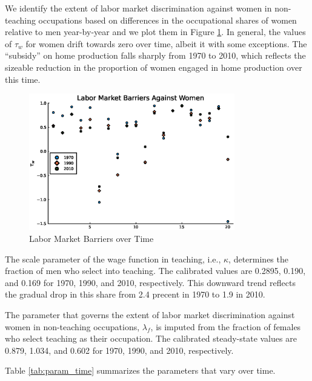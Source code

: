 \documentclass[onehalfspacing,11pt]{article}
\begin{document}
	We identify the extent of labor market discrimination against women in non-teaching occupations based on differences in the occupational shares of women relative to men year-by-year and we plot them in Figure \ref{fig:bar}. In general, the values of $\tau_w$ for women drift towards zero over time, albeit it with some exceptions. The ``subsidy'' on home production falls sharply from 1970 to 2010, which reflects the sizeable reduction in the proportion of women engaged in home production over this time.
	
		\begin{figure}
		\begin{center}
			\includegraphics[width=0.8\textwidth]{tau_w_women_70_10.eps}
			\caption{Labor Market Barriers over Time}
			\label{fig:bar}
		\end{center}
	\end{figure}
	
	The scale parameter of the wage function in teaching, i.e., $\kappa$, determines the fraction of men who select into teaching. The calibrated values are 0.2895, 0.190, and 0.169 for 1970, 1990, and 2010, respectively. This downward trend reflects the gradual drop in this share from 2.4 precent in 1970 to 1.9 in 2010.
	
	The parameter that governs the extent of labor market discrimination against women in non-teaching occupations, $\lambda_f$, is imputed from the fraction of females who select teaching as their occupation. The calibrated steady-state values are 0.879, 1.034, and 0.602 for 1970, 1990, and 2010, respectively.

Table \ref{tab:param_time} summarizes the parameters that vary over time. 		
\end{document}
